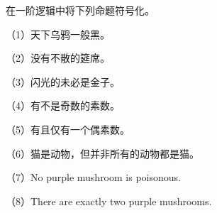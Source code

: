 在一阶逻辑中将下列命题符号化。

（1）天下乌鸦一般黑。

（2）没有不散的筵席。

（3）闪光的未必是金子。

（4）有不是奇数的素数。

（5）有且仅有一个偶素数。

（6）猫是动物，但并非所有的动物都是猫。

（7）No purple mushroom is poisonous.

（8）There are exactly two purple mushrooms.
